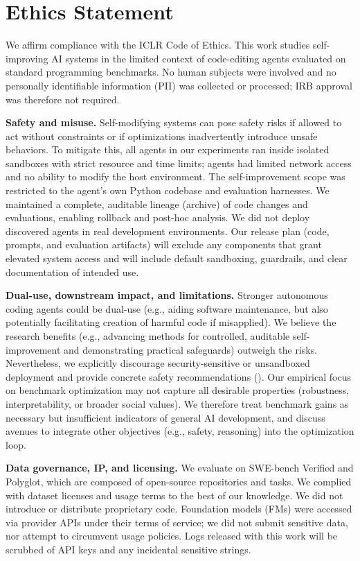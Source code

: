 \documentclass{article} %
\begin{document}
\newpage

\section*{Ethics Statement}

We affirm compliance with the ICLR Code of Ethics. This work studies self-improving AI systems in the limited context of code-editing agents evaluated on standard programming benchmarks. No human subjects were involved and no personally identifiable information (PII) was collected or processed; IRB approval was therefore not required.

\textbf{Safety and misuse.}
Self-modifying systems can pose safety risks if allowed to act without constraints or if optimizations inadvertently introduce unsafe behaviors. To mitigate this, all agents in our experiments ran inside isolated sandboxes with strict resource and time limits; agents had limited network access and no ability to modify the host environment. The self-improvement scope was restricted to the agent’s own Python codebase and evaluation harnesses. We maintained a complete, auditable lineage (archive) of code changes and evaluations, enabling rollback and post-hoc analysis. We did not deploy discovered agents in real development environments. Our release plan (code, prompts, and evaluation artifacts) will exclude any components that grant elevated system access and will include default sandboxing, guardrails, and clear documentation of intended use.

\textbf{Dual-use, downstream impact, and limitations.}
Stronger autonomous coding agents could be dual-use (e.g., aiding software maintenance, but also potentially facilitating creation of harmful code if misapplied). We believe the research benefits (e.g., advancing methods for controlled, auditable self-improvement and demonstrating practical safeguards) outweigh the risks. Nevertheless, we explicitly discourage security-sensitive or unsandboxed deployment and provide concrete safety recommendations (). Our empirical focus on benchmark optimization may not capture all desirable properties (robustness, interpretability, or broader social values). We therefore treat benchmark gains as necessary but insufficient indicators of general AI development, and discuss avenues to integrate other objectives (e.g., safety, reasoning) into the optimization loop.

\textbf{Data governance, IP, and licensing.}
We evaluate on SWE-bench Verified and Polyglot, which are composed of open-source repositories and tasks. We complied with dataset licenses and usage terms to the best of our knowledge. We did not introduce or distribute proprietary code. Foundation models (FMs) were accessed via provider APIs under their terms of service; we did not submit sensitive data, nor attempt to circumvent usage policies. Logs released with this work will be scrubbed of API keys and any incidental sensitive strings.
\end{document}
